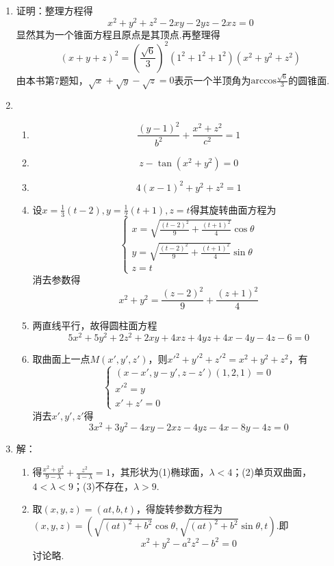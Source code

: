 \documentclass[UTF8]{ctexart}
\begin{document}
\begin{enumerate}
\item 证明：整理方程得$$x^2+y^2+z^2-2xy-2yz-2xz=0$$显然其为一个锥面方程且原点是其顶点.再整理得$$\left(x+y+z\right)^2=\left(\frac{\sqrt{6}}{3}\right)^2\left(1^2+1^2+1^2\right)\left(x^2+y^2+z^2\right)$$由本书第7题知，$\sqrt{x}+\sqrt{y}-\sqrt{z}=0$表示一个半顶角为$\mathrm{arccos}\displaystyle\frac{\sqrt{6}}{3}$的圆锥面. 

\item \begin{enumerate}[(1)]
\item $$\frac{\left(y-1\right)^2}{b^2}+\frac{x^2+z^2}{c^2}=1$$
\item $$z-\tan\left(x^2+y^2\right)=0$$
\item $$4\left(x-1\right)^2+y^2+z^2=1$$
\item 设$x=\displaystyle\frac{1}{3}\left(t-2\right),y=\displaystyle\frac{1}{2}\left(t+1\right),z=t$得其旋转曲面方程为$$\left\{\begin{array}{l}x=\sqrt{\displaystyle\frac{\left(t-2\right)^2}{9}+\displaystyle\frac{\left(t+1\right)^2}{4}}\cos\theta\\y=\sqrt{\displaystyle\frac{\left(t-2\right)^2}{9}+\displaystyle\frac{\left(t+1\right)^2}{4}}\sin\theta\\z=t\end{array}\right.$$消去参数得$$x^2+y^2=\displaystyle\frac{\left(z-2\right)^2}{9}+\displaystyle\frac{\left(z+1\right)^2}{4}$$
\item 两直线平行，故得圆柱面方程$$5x^2+5y^2+2z^2+2xy+4xz+4yz+4x-4y-4z-6=0$$
\item 取曲面上一点$M\left(x',y',z'\right)$，则$x'^2+y'^2+z'^2=x^2+y^2+z^2$，有$$\left\{\begin{array}{l}\left(x-x',y-y',z-z'\right)\left(1,2,1\right)=0\\x'^2=y\\x'+z'=0\end{array}\right.$$消去$x',y',z'$得$$3x^2+3y^2-4xy-2xz-4yz-4x-8y-4z=0$$
\end{enumerate}

\item 解：\begin{enumerate}[(1)]
\item 得$\displaystyle\frac{x^2+y^2}{9-\lambda}+\displaystyle\frac{z^2}{4-\lambda}=1$，其形状为(1)椭球面，$\lambda<4$；(2)单页双曲面，$4<\lambda<9$；(3)不存在，$\lambda>9$.
\item 取$\left(x,y,z\right)=\left(at,b,t\right)$，得旋转参数方程为$\left(x,y,z\right)=\left(\sqrt{\left(at\right)^2+b^2}\cos\theta,\sqrt{\left(at\right)^2+b^2}\sin\theta,t\right).$即$$x^2+y^2-a^2z^2-b^2=0$$讨论略.
\end{enumerate}


\end{enumerate}
\end{document}
